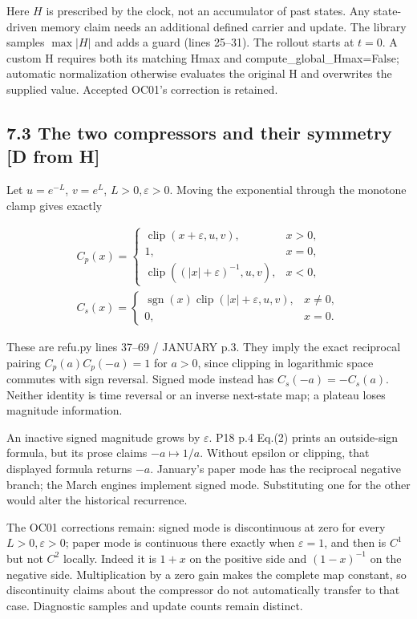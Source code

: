 \documentclass[11pt,a4paper]{article}
\begin{document}
Here $H$ is prescribed by the clock, not an accumulator of past states. Any state-driven memory claim needs an additional defined carrier and update. The library samples $\max|H|$ and adds a guard (lines 25--31). The rollout starts at $t=0$. A custom H requires both its matching Hmax and compute\_\allowbreak{}global\_\allowbreak{}Hmax=False; automatic normalization otherwise evaluates the original H and overwrites the supplied value. Accepted OC01's correction is retained.


\subsection*{7.3 The two compressors and their symmetry [D from H]}

Let $u=e^{-L}$, $v=e^L$, $L>0,\varepsilon>0$. Moving the exponential through the monotone clamp gives exactly


\[
\begin{gathered}C_p(x)=
\begin{cases}
\operatorname{clip}(x+\varepsilon,u,v),&x>0,\\
1,&x=0,\\
\operatorname{clip}((|x|+\varepsilon)^{-1},u,v),&x<0,
\end{cases}
\\[6pt]
C_s(x)=
\begin{cases}\operatorname{sgn}(x)\operatorname{clip}(|x|+\varepsilon,u,v),&x\ne0,\\0,&x=0.\end{cases} \end{gathered}\tag{25}
\]

These are refu.py lines 37--69 / JANUARY p.3. They imply the exact reciprocal pairing $C_p(a)C_p(-a)=1$ for $a>0$, since clipping in logarithmic space commutes with sign reversal. Signed mode instead has $C_s(-a)=-C_s(a)$. Neither identity is time reversal or an inverse next-state map; a plateau loses magnitude information.


An inactive signed magnitude grows by $\varepsilon$. P18 p.4 Eq.(2) prints an outside-sign formula, but its prose claims $-a\mapsto1/a$. Without epsilon or clipping, that displayed formula returns \textbf{$-a$}. January's paper mode has the reciprocal negative branch; the March engines implement signed mode. Substituting one for the other would alter the historical recurrence.


The OC01 corrections remain: signed mode is discontinuous at zero for every $L>0,\varepsilon>0$; paper mode is continuous there exactly when $\varepsilon=1$, and then is $C^1$ but not $C^2$ locally. Indeed it is $1+x$ on the positive side and $(1-x)^{-1}$ on the negative side. Multiplication by a zero gain makes the complete map constant, so discontinuity claims about the compressor do not automatically transfer to that case. Diagnostic samples and update counts remain distinct.
\end{document}

